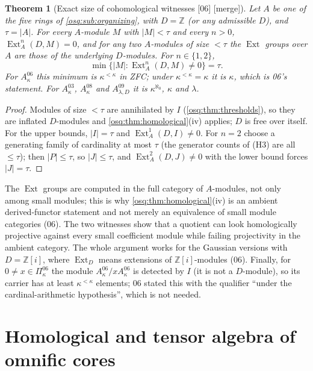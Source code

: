 \documentclass[11pt,letterpaper]{article}
\numberwithin{equation}{section}
\newtheorem{theorem}{Theorem}[section]
\theoremstyle{definition}
\theoremstyle{remark}
\theoremstyle{plain}
\newcommand{\Z}{\mathbb Z}
\newcommand{\Ext}{\operatorname{Ext}}
\newcommand{\src}[1]{\textup{\textsf{[#1]}}}
\newcommand{\merge}{\textup{\textsf{[merge]}}}
\begin{document}
\begin{theorem}[Exact size of cohomological witnesses \src{06} \merge]\label{osq:thm:extthreshold}
Let $A$ be one of the five rings of \cref{osq:sub:organizing}, with $D=\Z$ (or any admissible $D$), and
$\tau=|A|$. For every $A$-module $M$ with $|M|<\tau$ and every $n>0$, $\Ext^n_A(D,M)=0$, and for any two
$A$-modules of size $<\tau$ the $\Ext$ groups over $A$ are those of the underlying $D$-modules. For
$n\in\{1,2\}$,
\[
 \min\{|M|:\Ext^n_A(D,M)\ne0\}=\tau .
\]
For $A^{06}_\kappa$ this minimum is $\kappa^{<\kappa}$ in ZFC; under $\kappa^{<\kappa}=\kappa$ it is $\kappa$,
which is 06's statement. For $A^{03}_\kappa$, $A^{08}_\kappa$ and $A^{09}_{\lambda,D}$ it is $\kappa^{\aleph_0}$,
$\kappa$ and $\lambda$.
\end{theorem}
\begin{proof}
Modules of size $<\tau$ are annihilated by $I$ (\cref{osq:thm:thresholds}), so they are inflated $D$-modules
and \cref{osq:thm:homological}(iv) applies; $D$ is free over itself. For the upper bounds, $|I|=\tau$ and
$\Ext^1_A(D,I)\ne0$. For $n=2$ choose a generating family of cardinality at most $\tau$ (the generator counts of (H3) are all $\le\tau$); then $|P|\le\tau$, so
$|J|\le\tau$, and $\Ext^2_A(D,J)\ne0$ with the lower bound forces $|J|=\tau$.
\end{proof}

The $\Ext$ groups are computed in the full category of $A$-modules, not only among small modules; this is why
\cref{osq:thm:homological}(iv) is an ambient derived-functor statement and not merely an equivalence of small
module categories (06). The two witnesses show that a quotient can look homologically projective against every
small coefficient module while failing projectivity in the ambient category. The whole argument works for the
Gaussian versions with $D=\Z[i]$, where $\Ext_D$ means extensions of $\Z[i]$-modules (06). Finally, for
$0\ne x\in\Pi^{06}_\kappa$ the module $A^{06}_\kappa/xA^{06}_\kappa$ is detected by $I$ (it is not a $D$-module), so
its carrier has at least $\kappa^{<\kappa}$ elements; 06 stated this with the qualifier ``under the
cardinal-arithmetic hypothesis'', which is not needed.

\section{Homological and tensor algebra of omnific cores}\label{osq:hd:sec:cores}
\end{document}
